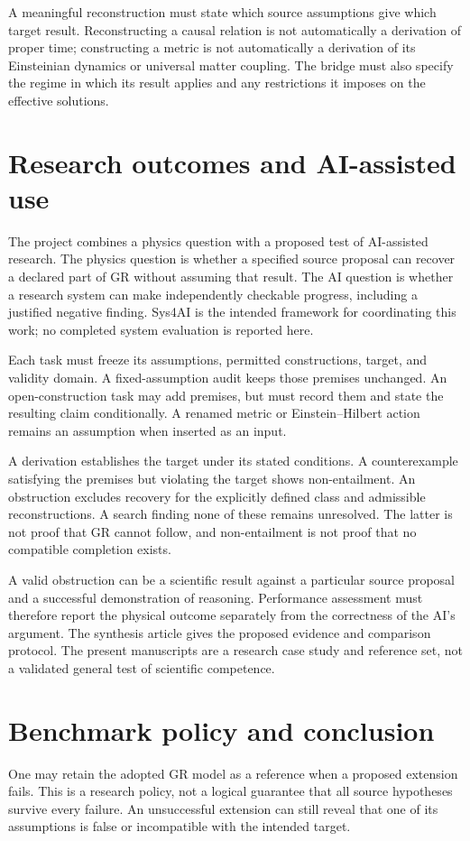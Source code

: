 \documentclass[11pt,oneside]{report}
\theoremstyle{remark}
\numberwithin{definition}{chapter}
\numberwithin{proposition}{chapter}
\numberwithin{remark}{chapter}
\begin{document}
A meaningful reconstruction must state which source assumptions give which target result. Reconstructing a causal relation is not automatically a derivation of proper time; constructing a metric is not automatically a derivation of its Einsteinian dynamics or universal matter coupling. The bridge must also specify the regime in which its result applies and any restrictions it imposes on the effective solutions.


\section{Research outcomes and AI-assisted use}
The project combines a physics question with a proposed test of AI-assisted research. The physics question is whether a specified source proposal can recover a declared part of GR without assuming that result. The AI question is whether a research system can make independently checkable progress, including a justified negative finding. Sys4AI is the intended framework for coordinating this work; no completed system evaluation is reported here.

Each task must freeze its assumptions, permitted constructions, target, and validity domain. A fixed-assumption audit keeps those premises unchanged. An open-construction task may add premises, but must record them and state the resulting claim conditionally. A renamed metric or Einstein--Hilbert action remains an assumption when inserted as an input.

A derivation establishes the target under its stated conditions. A counterexample satisfying the premises but violating the target shows non-entailment. An obstruction excludes recovery for the explicitly defined class and admissible reconstructions. A search finding none of these remains unresolved. The latter is not proof that GR cannot follow, and non-entailment is not proof that no compatible completion exists.

A valid obstruction can be a scientific result against a particular source proposal and a successful demonstration of reasoning. Performance assessment must therefore report the physical outcome separately from the correctness of the AI's argument. The synthesis article gives the proposed evidence and comparison protocol. The present manuscripts are a research case study and reference set, not a validated general test of scientific competence.

\section{Benchmark policy and conclusion}
One may retain the adopted GR model as a reference when a proposed extension fails. This is a research policy, not a logical guarantee that all source hypotheses survive every failure. An unsuccessful extension can still reveal that one of its assumptions is false or incompatible with the intended target.
\end{document}
